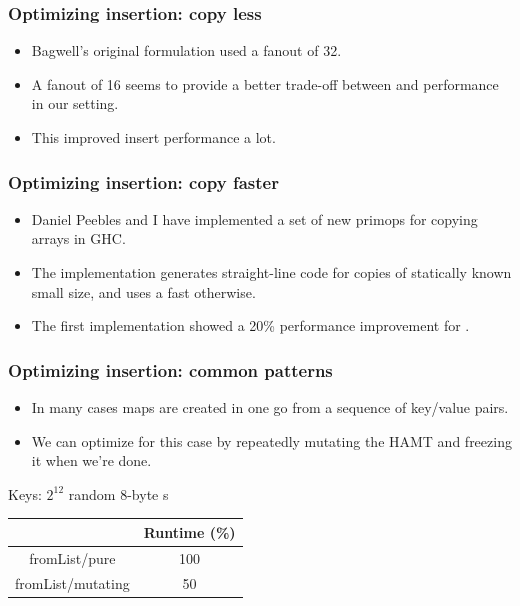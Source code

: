 \documentclass[xetex,mathserif,serif]{beamer}
\newcommand{\code}[1]{\mbox{\texttt{\small{\color{CodeColor}{#1}}}}}
\begin{document}
\begin{frame}
  \frametitle{Optimizing insertion: copy less}

  \begin{itemize}
  \item Bagwell's original formulation used a fanout of 32.
  \item A fanout of 16 seems to provide a better trade-off between
    \code{lookup} and \code{insert} performance in our setting.
  \item This improved insert performance a lot.
  \end{itemize}
\end{frame}

\begin{frame}
  \frametitle{Optimizing insertion: copy faster}

  \begin{itemize}
  \item Daniel Peebles and I have implemented a set of new primops for
    copying arrays in GHC.
  \item The implementation generates straight-line code for copies of
    statically known small size, and uses a fast \code{memcpy}
    otherwise.
  \item The first implementation showed a 20\% performance improvement
    for \code{insert}.
  \end{itemize}
\end{frame}

\begin{frame}
  \frametitle{Optimizing insertion: common patterns}
  \begin{itemize}
  \item In many cases maps are created in one go from a sequence of
    key/value pairs.
  \item We can optimize for this case by repeatedly mutating the HAMT
    and freezing it when we're done.
  \end{itemize}

  \bigskip
  Keys: $2^{12}$ random 8-byte \code{ByteString}s

  \bigskip
  \begin{center}
  \begin{tabular}{c|c}
                         & Runtime (\%) \\
    \hline fromList/pure & 100 \\
           fromList/mutating & 50 \\
  \end{tabular}
  \end{center}
\end{frame}
\end{document}
